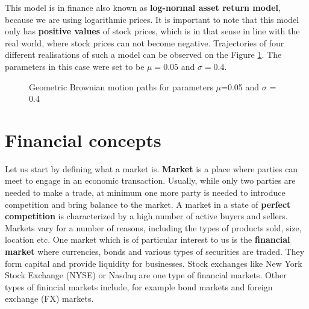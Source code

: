 \documentclass[times, utf8, diplomski]{fer}
\begin{document}
\noindent This model is in finance also known as \textbf{log-normal asset return model}, because we are using logarithmic prices. It is important to note that this model only has \textbf{positive values} of stock prices, which is in that sense in line with the real world, where stock prices can not become negative. Trajectories of four different realisations of such a model can be observed on the Figure \ref{fig:gbm_paths}. The parameters in this case were set to be $\mu=0.05$ and $\sigma = 0.4$.
\vspace{1cm}
\begin{figure}[ht]
\centering
{}
\caption{Geometric Brownian motion paths for parameters $\mu$=0.05 and $\sigma$ = 0.4}
\label{fig:gbm_paths}
\end{figure}

\chapter{Financial concepts}
Let us start by defining what a market is. \textbf{Market} is a place where parties can meet to engage in an economic transaction. Usually, while only two parties are needed to make a trade, at minimum one more party is needed to introduce competition and bring balance to the market. A market in a state of \textbf{perfect competition} is characterized by a high number of active buyers and sellers. Markets vary for a number of reasons, including the types of products sold, size, location etc. One market which is of particular interest to us is the \textbf{financial market} where currencies, bonds and various types of securities are traded. They form capital and provide liquidity for businesses. Stock exchanges like New York Stock Exchange (NYSE) or Nasdaq are one type of financial markets. Other types of finincial markets include, for example bond markets and foreign exchange (FX) markets. 
\end{document}
